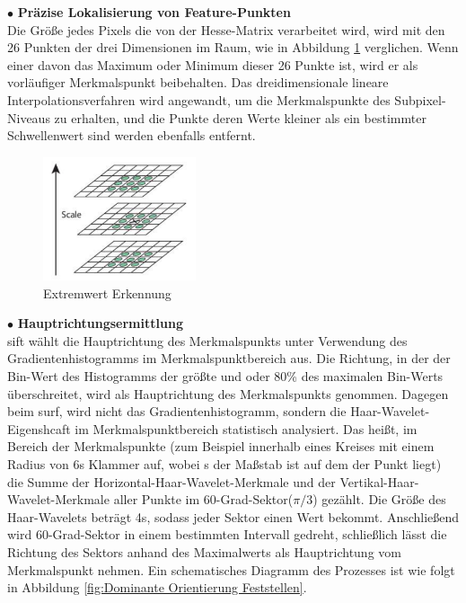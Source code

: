 $\bullet$ \textbf{Präzise Lokalisierung von Feature-Punkten}\\
Die Größe jedes Pixels die von der Hesse-Matrix verarbeitet wird, wird mit den 26 Punkten der drei Dimensionen im Raum, wie in Abbildung \ref{fig:Extremwert Erkennung} verglichen. Wenn einer davon das Maximum oder Minimum dieser 26 Punkte ist, wird er als vorläufiger Merkmalspunkt beibehalten. Das dreidimensionale lineare Interpolationsverfahren wird angewandt, um die Merkmalspunkte des Subpixel-Niveaus zu erhalten, und die Punkte deren Werte kleiner als ein bestimmter Schwellenwert sind werden ebenfalls entfernt.

\begin{figure}[htb]
 \centering 
 \includegraphics[keepaspectratio,width=0.4\textwidth]{images/3_Ersteverfahren/Extreme_Wert_Erkennung.pdf}
 \caption{Extremwert Erkennung}
 \label{fig:Extremwert Erkennung}
\end{figure} 


$\bullet$ \textbf{Hauptrichtungsermittlung}\\
\gls{sift} wählt die Hauptrichtung des Merkmalspunkts unter Verwendung des Gradientenhistogramms im Merkmalspunktbereich aus. Die Richtung, in der der Bin-Wert des Histogramms der größte und oder 80\% des maximalen Bin-Werts überschreitet, wird als Hauptrichtung des Merkmalspunkts genommen. Dagegen beim \gls{surf}, wird nicht das Gradientenhistogramm, sondern die Haar-Wavelet-Eigenshcaft im Merkmalspunktbereich statistisch analysiert. Das heißt, im Bereich der Merkmalspunkte (zum Beispiel innerhalb eines Kreises mit einem Radius von 6\si{s} Klammer auf, wobei s der Maßstab ist auf dem der Punkt liegt) die Summe der Horizontal-Haar-Wavelet-Merkmale und der Vertikal-Haar-Wavelet-Merkmale aller Punkte im  60-Grad-Sektor($\pi/3$) gezählt. Die Größe des Haar-Wavelets beträgt 4\si{s}, sodass jeder Sektor einen Wert bekommt. Anschließend wird 60-Grad-Sektor in einem bestimmten Intervall gedreht, schließlich lässt die Richtung des Sektors anhand des Maximalwerts als Hauptrichtung vom Merkmalspunkt nehmen. Ein schematisches Diagramm des Prozesses ist wie folgt in Abbildung \ref{fig:Dominante Orientierung Feststellen}.

